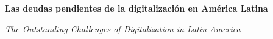 \documentclass{article}
\renewcommand{\normalsize}{\fontsize{10pt}{13pt}\selectfont}
\newcommand{\articulotipo}{}
\newcommand{\articulotitulo}{}
\newcommand{\articulotitulotrans}{}
\newcommand{\articuloautores}{}
\newcommand{\articulodoi}{}
\newcommand{\articuloidiomaxml}{es}
\newcommand{\articulorevista}{}
\newcommand{\articuloissne}{}
\newcommand{\articulovolumen}{}
\newcommand{\articulonumero}{}
\newcommand{\articulofecha}{}
\newcommand{\articulopagina}{0}
\begin{document}

\renewcommand{\articuloidiomaxml}{es}
\renewcommand{\articulotitulo}{Las deudas pendientes de la digitalización en América Latina}
\renewcommand{\articuloautores}{Luciana Ferrer}
\renewcommand{\articulodoi}{10.2139/ssrn.2852942}
\renewcommand{\articulotipo}{EDITORIAL}
\renewcommand{\articulorevista}{Conexiones: Revista Latinoamericana de Sociedad y Tecnología}
\renewcommand{\articuloissne}{0327-7712}
\renewcommand{\articulovolumen}{01}
\renewcommand{\articulonumero}{01}
\renewcommand{\articulofecha}{ 2026}
\renewcommand{\articulopagina}{1}

\setcounter{page}{1}
\thispagestyle{firstpage}

\noindent\begin{minipage}[t]{\dimexpr\textwidth+\marginparsep+\marginparwidth\relax}%
{\sffamily\bfseries\Large\articulotitulo\par}%
\end{minipage}\par
\vspace{3mm}%
\renewcommand{\articulotitulotrans}{The Outstanding Challenges of Digitalization in Latin America}
\noindent\begin{minipage}[t]{\dimexpr\textwidth+\marginparsep+\marginparwidth\relax}%
{\sffamily\itshape\normalsize\articulotitulotrans\par}%
\end{minipage}\par
\vspace{4mm}%
\end{document}
